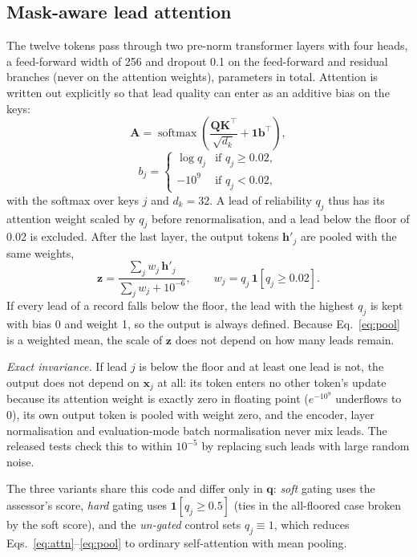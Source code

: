 \subsection{Mask-aware lead attention}
\label{sec:method-mala}
The twelve tokens pass through two pre-norm transformer layers with four heads, a feed-forward width of 256 and
dropout 0.1 on the feed-forward and residual branches (never on the attention weights), \paramsLgAttention{}
parameters in total. Attention is written out explicitly so that lead quality can enter as an additive bias on
the keys:
\begin{equation}
\mathbf{A}=\operatorname{softmax}\!\left(\frac{\mathbf{Q}\mathbf{K}^{\top}}{\sqrt{d_k}}+\mathbf{1}\mathbf{b}^{\top}\right),
\label{eq:attn}
\end{equation}
\begin{equation}
b_j=\begin{cases}\log q_j & \text{if } q_j\ge0.02,\\ -10^{9} & \text{if } q_j<0.02,\end{cases}
\label{eq:bias}
\end{equation}
with the softmax over keys $j$ and $d_k=32$. A lead of reliability $q_j$ thus has its attention weight scaled by
$q_j$ before renormalisation, and a lead below the floor of 0.02 is excluded. After the last layer, the output
tokens $\mathbf{h}'_j$ are pooled with the same weights,
\begin{equation}
\mathbf{z}=\frac{\sum_j w_j\,\mathbf{h}'_j}{\sum_j w_j+10^{-6}},\qquad w_j=q_j\,\mathbf{1}[q_j\ge0.02].
\label{eq:pool}
\end{equation}
If every lead of a record falls below the floor, the lead with the highest $q_j$ is kept with bias 0 and weight 1,
so the output is always defined. Because Eq.~\eqref{eq:pool} is a weighted mean, the scale of $\mathbf{z}$ does not
depend on how many leads remain.

\emph{Exact invariance.} If lead $j$ is below the floor and at least one lead is not, the output does not depend
on $\mathbf{x}_j$ at all: its token enters no other token's update because its attention weight is exactly zero
in floating point ($e^{-10^{9}}$ underflows to 0), its own output token is pooled with weight zero, and the
encoder, layer normalisation and evaluation-mode batch normalisation never mix leads. The released tests check
this to within $10^{-5}$ by replacing such leads with large random noise.

The three variants share this code and differ only in $\mathbf{q}$: \emph{soft} gating uses the
assessor's score, \emph{hard} gating uses $\mathbf{1}[q_j\ge0.5]$ (ties in the all-floored case broken by the soft
score), and the \emph{un-gated} control sets $q_j\equiv1$, which reduces Eqs.~\eqref{eq:attn}--\eqref{eq:pool} to
ordinary self-attention with mean pooling.

